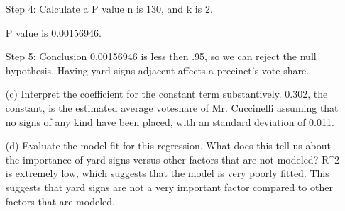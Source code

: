 \documentclass[12pt,letterpaper]{article}
\begin{document}
\begin{enumerate}
	Step 4: Calculate a P value
	n is 130, and k is 2.
	
	
	
	P value is 0.00156946.
	
	Step 5: Conclusion
	0.00156946 is less then .95, so we can reject the null hypothesis. Having yard signs adjacent affects a precinct's vote share.
	
	
	\vspace{7cm}
	\item [(c)] Interpret the coefficient for the constant term substantively.
	\vspace{7cm}
	0.302, the constant, is the estimated average voteshare of Mr. Cuccinelli assuming that no signs of any kind have been placed, with an standard deviation of 0.011.
	
	\item [(d)] Evaluate the model fit for this regression.  What does this	tell us about the importance of yard signs versus other factors that are not modeled?
	R^2 is extremely low, which suggests that the model is very poorly fitted. This suggests that yard signs are not a very important factor compared to other factors that are modeled. 
	
\end{enumerate}  
\end{document}
